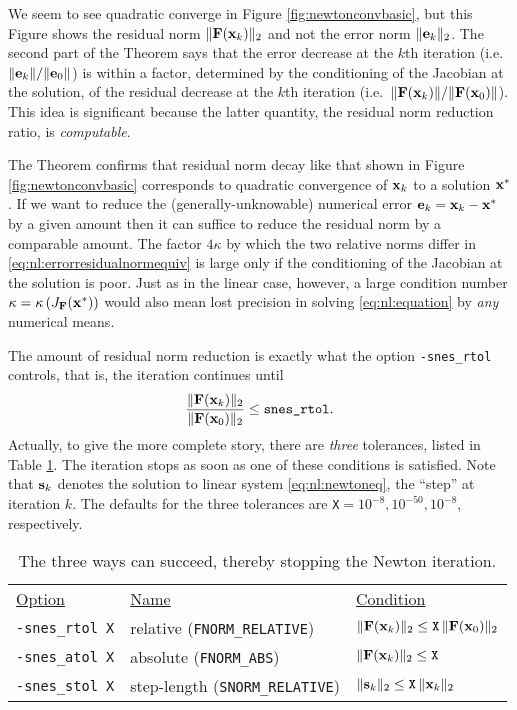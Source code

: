 We seem to see quadratic converge in Figure \ref{fig:newtonconvbasic}, but this Figure shows the residual norm $\|\mathbf{F}(\mathbf{x}_k)\|_2$ and not the error norm $\|\mathbf{e}_k\|_2$.  The second part of the Theorem says that the error decrease at the $k$th iteration (i.e.~$\|\mathbf{e}_k\|/\|\mathbf{e}_0\|$) is within a factor, determined by the conditioning of the Jacobian at the solution, of the residual decrease at the $k$th iteration (i.e.~$\|\mathbf{F}(\mathbf{x}_k)\|/\|\mathbf{F}(\mathbf{x}_0)\|$).  This idea is significant because the latter quantity, the residual norm reduction ratio, is \emph{computable}.

The Theorem confirms that residual norm decay like that shown in Figure \ref{fig:newtonconvbasic} corresponds to quadratic convergence of $\mathbf{x}_k$ to a solution $\mathbf{x}^*$.  If we want to reduce the (generally-unknowable) numerical error $\mathbf{e}_k=\mathbf{x}_k-\mathbf{x}^*$ by a given amount then it can suffice to reduce the residual norm by a comparable amount.  The factor $4 \kappa$ by which the two relative norms differ in \eqref{eq:nl:errorresidualnormequiv} is large only if the conditioning of the Jacobian at the solution is poor.  Just as in the linear case, however, a large condition number $\kappa=\kappa\left(J_{\mathbf{F}}(\mathbf{x}^*)\right)$ would also mean lost precision in solving \eqref{eq:nl:equation} by \emph{any} numerical means.

The amount of residual norm reduction is exactly what the option \texttt{-snes\_rtol} controls, that is, the iteration continues until
    $$\frac{\|\mathbf{F}(\mathbf{x}_k)\|_2}{\|\mathbf{F}(\mathbf{x}_0)\|_2} \le \text{\texttt{snes\_rtol}}.$$
Actually, to give the more complete story, there are \emph{three} \pSNES tolerances, listed in Table \ref{tab:snestolerances}.  The iteration stops as soon as one of these conditions is satisfied.  Note that $\mathbf{s}_k$ denotes the solution to linear system \eqref{eq:nl:newtoneq}, the ``step'' at iteration $k$.  The defaults for the three tolerances are \texttt{X}$=10^{-8},10^{-50},10^{-8}$, respectively.

\medskip
\begin{table}
\begin{tabular}{lll}
\underline{Option}\hspace{0.2in} & \underline{Name}\hspace{0.2in} & \underline{Condition}\hspace{0.2in} \\
\texttt{-snes\_rtol X} & relative (\texttt{FNORM\_RELATIVE}) & $\|\mathbf{F}(\mathbf{x}_k)\|_2 \le \text{\texttt{X}}\, \|\mathbf{F}(\mathbf{x}_0)\|_2$ \\
\texttt{-snes\_atol X} & absolute (\texttt{FNORM\_ABS}) & $\|\mathbf{F}(\mathbf{x}_k)\|_2 \le \text{\texttt{X}}$ \\
\texttt{-snes\_stol X} & step-length (\texttt{SNORM\_RELATIVE}) & $\|\mathbf{s}_k\|_2 \le \text{\texttt{X}}\, \|\mathbf{x}_k\|_2$
\end{tabular}
\caption{The three ways \pSNES can succeed, thereby stopping the Newton iteration.} \label{tab:snestolerances}
\end{table}

